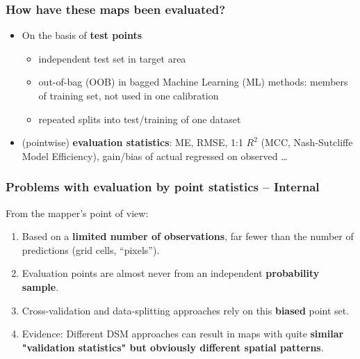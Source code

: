 \documentclass[aspectratio=169]{beamer}
\begin{document}
\begin{frame}
  \frametitle{How have these maps been evaluated?}
    \begin{itemize}
        \item On the basis of \textbf{test points}
        \begin{itemize}
            \item independent test set in target area
            \item out-of-bag (OOB) in bagged Machine Learning (ML) methods: members of training set, not used in one calibration
            \item repeated splits into test/training of one dataset
        \end{itemize}
        \item (pointwise) \textbf{evaluation statistics}: ME, RMSE,
          1:1 $R^2$ (MCC, Nash-Sutcliffe Model Efficiency), gain/bias
          of actual regressed on observed \ldots
    \end{itemize}
\end{frame}


\begin{frame}
  \frametitle{Problems with evaluation by point statistics -- Internal}
From the mapper's point of view:
\begin{enumerate}
    \item Based on a \textbf{limited number of observations}, far fewer than the number of predictions (grid cells, ``pixels'').
\item Evaluation points are almost never from an independent \textbf{probability sample}.
\item Cross-validation and data-splitting approaches rely on this \textbf{biased} point set.
\item Evidence: Different DSM approaches can result in maps with quite \textbf{similar "validation statistics" but obviously different spatial patterns}.
  \end{enumerate}
  
\end{frame}
\end{document}
